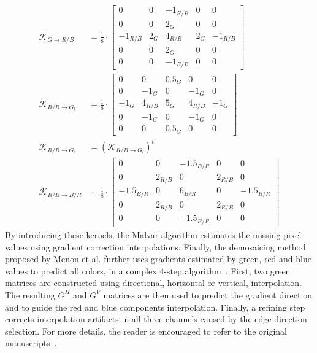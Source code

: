 \documentclass[12pt]{iopart}
\begin{document}
\begin{align}
     \mathcal{K}_{G\rightarrow R/B} &= \frac{1}{8} \cdot \begin{bmatrix}
    0 & 0 & -1_{R/B} & 0 & 0 \\
    0 & 0 & 2_G & 0 & 0 \\
    -1_{R/B} & 2_G & 4_{R/B} & 2_G & -1_{R/B} \\
    0 & 0 & 2_G & 0 & 0 \\
    0 & 0 & -1_{R/B} & 0 & 0
    \end{bmatrix} \\
      \mathcal{K}_{R/B\rightarrow G_l} &= \frac{1}{8} \cdot \begin{bmatrix}
    0 & 0 & 0.5_{G} & 0 & 0 \\
    0 & -1_{G} & 0 & -1_{G} & 0 \\
    -1_{G} & 4_{R/B} & 5_G & 4_{R/B} & -1_{G} \\
    0 & -1_{G} & 0 & -1_{G} & 0 \\
    0 & 0 & 0.5_{G} & 0 & 0
    \end{bmatrix} \\
    \mathcal{K}_{R/B\rightarrow G_c} &= (\mathcal{K}_{R/B\rightarrow G_l})^t \\
         \mathcal{K}_{R/B\rightarrow B/R} &= \frac{1}{8} \cdot \begin{bmatrix}
    0 & 0 & -1.5_{B/R} & 0 & 0 \\
    0 & 2_{R/B} & 0 & 2_{R/B} & 0 \\
    -1.5_{B/R} & 0 & 6_{B/R} & 0 & -1.5_{B/R} \\
    0 & 2_{R/B} & 0 & 2_{R/B} & 0 \\
    0 & 0 & -1.5_{B/R} & 0 & 0
    \end{bmatrix} 
\end{align}
By introducing these kernels, the Malvar algorithm estimates the missing pixel values using gradient correction interpolations. Finally, the demosaicing method proposed by Menon et al. further uses gradients estimated by green, red and blue values to predict all colors, in a complex 4-step algorithm~\cite{Menon_2007}. First, two green matrices are constructed using directional, horizontal or vertical, interpolation. The resulting $G^H$ and $G^V$ matrices are then used to predict the gradient direction and to guide the red and blue components interpolation. Finally, a refining step corrects interpolation artifacts in all three channels caused by the edge direction selection. For more details, the reader is encouraged to refer to the original manuscripts~\cite{Malvar_2004,Menon_2007}.     
\end{document}
